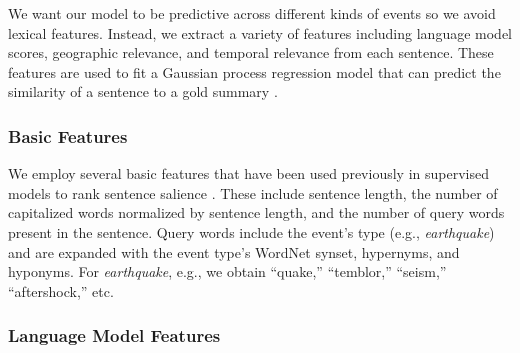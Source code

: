 \documentclass[10pt]{article} \usepackage{url} \usepackage{color}
\begin{document}
 

We want our model to be predictive across different kinds of events so we
avoid lexical features.  Instead, we extract a variety of features including
language model scores, geographic relevance, and temporal relevance from each
sentence.  These features are used to fit a Gaussian process regression model
that can predict the similarity of a sentence to a gold summary
\cite{preotiuc2013temporal}.  

\subsubsection{Basic Features}

We employ several basic features that have been used previously in supervised
models to rank sentence salience \cite{kupiec1995trainable,conroy2001using}.
These include sentence length, the number of capitalized words normalized by
sentence length, and the number of query words present in the sentence.  Query
words include the event's type (e.g., \emph{earthquake}) and are expanded with
the event type's WordNet \cite{miller1995wordnet} synset, hypernyms, and
hyponyms.  For \emph{earthquake}, e.g., we obtain ``quake,'' ``temblor,''
``seism,'' ``aftershock,'' etc.   


\subsubsection{Language Model Features}\label{subsubsec:lm}
\end{document}
